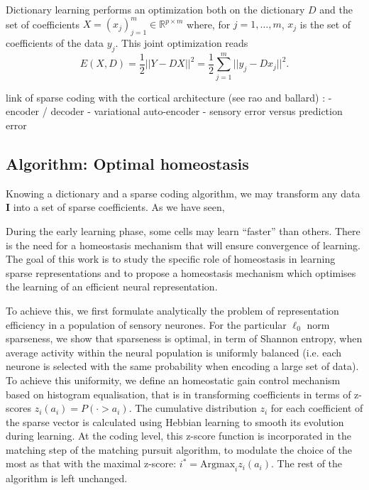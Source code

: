 \documentclass[a4paper, 11pt, draft]{article} %
\newcommand{\umin}[1]{\underset{#1}{\min}\;}
\newcommand{\norm}[1]{|\!| #1 |\!|}
\newcommand{\Xx}{\mathcal{X}}
\newcommand{\RR}{\mathbb{R}}
\newcommand{\Dd}{\mathcal{D}}
\newcommand{\image}{\mathbf{I}} %
\begin{document}
Dictionary learning performs an optimization both on the dictionary $D$
and the set of coefficients $ X = (x_j)_{j=1}^m \in \RR^{p \times m} $
where, for $j=1,\ldots,m$, $ x_j $
is the set of coefficients of the data $y_j$. This joint optimization reads
$$E(X,D) = \frac{1}{2}\norm{Y-DX}^2 =
\frac{1}{2} \sum_{j=1}^m \norm{y_j - D x_j}^2. $$


link of sparse coding with the cortical architecture (see rao and ballard) : 
- encoder / decoder
- variational auto-encoder
- sensory error versus prediction error

\subsection{Algorithm: Optimal homeostasis}\label{HEH}

Knowing a dictionary and a sparse coding algorithm, we may transform any data $\image$ into a set of sparse coefficients. As we have seen, 

During the early learning phase, some cells may learn ``faster'' than others. There is the need for a homeostasis mechanism that will ensure convergence of learning. The goal of this work is to study the specific role of homeostasis in learning sparse representations and to propose a homeostasis mechanism which optimises the learning of an efficient neural representation. 


To achieve this, we first formulate analytically the problem of representation efficiency in a population of sensory neurones. For the particular $\ell_0$ norm sparseness, we show that sparseness is optimal, in term of Shannon entropy, when average activity within the neural population is uniformly balanced (i.e. each neurone is selected with the same probability when encoding a large set of data). To achieve this uniformity, we define an homeostatic gain control mechanism based on histogram equalisation, that is in transforming coefficients in terms of z-scores $z_i(a_i) = P( \cdot > a_i)$. The cumulative distribution $z_i$ for each coefficient of the sparse vector is calculated using Hebbian learning to smooth its evolution during learning. At the coding level, this z-score function is incorporated in the matching step of the matching pursuit algorithm, to modulate the choice of the most  as that with the maximal z-score: $i^\ast = \mathrm{Argmax}_i z_i(a_i)$. The rest of the algorithm is left unchanged.
\end{document}
